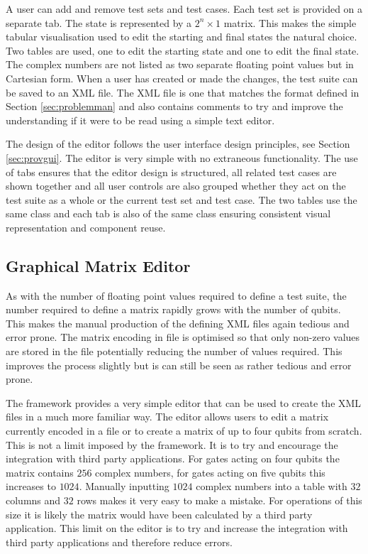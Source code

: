 A user can add and remove test sets and test cases.
Each test set is provided on a separate tab.
The state is represented by a $2^n\times{1}$ matrix.
This makes the simple tabular visualisation used to edit the starting and final states the natural choice.
Two tables are used, one to edit the starting state and one to edit the final state.
The complex numbers are not listed as two separate floating point values but in Cartesian form.
When a user has created or made the changes, the test suite can be saved to an XML file.
The XML file is one that matches the format defined in Section \ref{sec:problemman} and also contains comments to try and improve the understanding if it were to be read using a simple text editor.

The design of the editor follows the user interface design principles, see Section \ref{sec:provgui}.
The editor is very simple with no extraneous functionality.
The use of tabs ensures that the editor design is structured, all related test cases are shown together and all user controls are also grouped whether they act on the test suite as a whole or the current test set and test case.
The two tables use the same class and each tab is also of the same class ensuring consistent visual representation and component reuse.

\subsection{Graphical Matrix Editor}
\label{sec:indmatrixeditor}
As with the number of floating point values required to define a test suite, the number required to define a matrix rapidly grows with the number of qubits.
This makes the manual production of the defining XML files again tedious and error prone.
The matrix encoding in file is optimised so that only non-zero values are stored in the file potentially reducing the number of values required.
This improves the process slightly but is can still be seen as rather tedious and error prone.

The framework provides a very simple editor that can be used to create the XML files in a much more familiar way.
The editor allows users to edit a matrix currently encoded in a file or to create a matrix of up to four qubits from scratch.
This is not a limit imposed by the framework.
It is to try and encourage the integration with third party applications.
For gates acting on four qubits the matrix contains $256$ complex numbers, for gates acting on five qubits this increases to $1024$.
Manually inputting $1024$ complex numbers into a table with $32$ columns and $32$ rows makes it very easy to make a mistake.
For operations of this size it is likely the matrix would have been calculated by a third party application.
This limit on the editor is to try and increase the integration with third party applications and therefore reduce errors.

